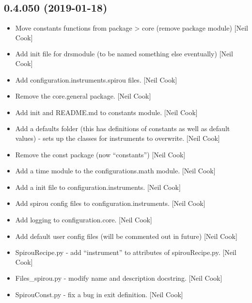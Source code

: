 \documentclass[a4paper,10pt,english]{report}
\begin{document}
\subsection{0.4.050 (2019-01-18)}
\label{\detokenize{misc/changelog:id212}}\begin{itemize}
\item {} 
Move constants functions from package \textendash{}\textgreater{} core (remove package module)
{[}Neil Cook{]}

\item {} 
Add init file for drsmodule (to be named something else eventually)
{[}Neil Cook{]}

\item {} 
Add configuration.instruments.spirou files. {[}Neil Cook{]}

\item {} 
Remove the core.general package. {[}Neil Cook{]}

\item {} 
Add init and README.md to constants module. {[}Neil Cook{]}

\item {} 
Add a defaults folder (this has definitions of constants as well as
default values) - sets up the classes for instruments to overwrite.
{[}Neil Cook{]}

\item {} 
Remove the const package (now “constants”) {[}Neil Cook{]}

\item {} 
Add a time module to the configurations.math module. {[}Neil Cook{]}

\item {} 
Add a init file to configuration.instruments. {[}Neil Cook{]}

\item {} 
Add spirou config files to configuration.instruments. {[}Neil Cook{]}

\item {} 
Add logging to configuration.core. {[}Neil Cook{]}

\item {} 
Add default user config files (will be commented out in future) {[}Neil
Cook{]}

\item {} 
SpirouRecipe.py - add “instrument” to attributes of spirouRecipe.py.
{[}Neil Cook{]}

\item {} 
Files\_spirou.py - modify name and description docstring. {[}Neil Cook{]}

\item {} 
SpirouConst.py - fix a bug in exit definition. {[}Neil Cook{]}

\end{itemize}
\end{document}
